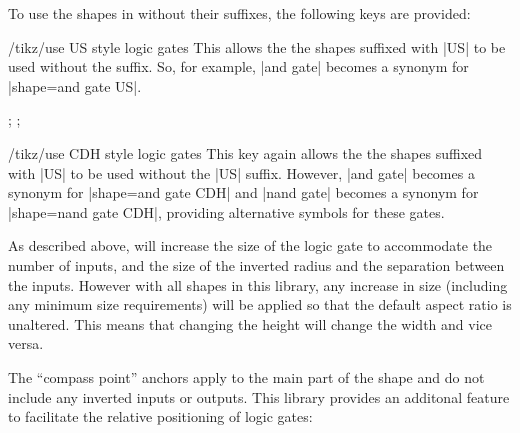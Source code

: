   To use the shapes in \tikzname{} without their suffixes, the 
  following keys are provided:
  
\begin{key}{/tikz/use US style logic gates}
	This allows the the shapes suffixed with |US| to be used without
	the suffix. So, for example, |and gate| becomes a synonym for
	|shape=and gate US|.
\begin{codeexample}[]
\tikz{};
\space
{};
\end{codeexample}
\end{key}

\begin{key}{/tikz/use CDH style logic gates}
	This key again allows the the shapes suffixed with |US| to be used 
	without	the |US| suffix. However, |and gate| becomes a synonym for
	|shape=and gate CDH| and |nand gate| becomes a synonym for
	|shape=nand gate CDH|, providing alternative symbols for these
	gates.
	
\begin{codeexample}[]
\end{codeexample}
\end{key}



As described above, \pgfname{} will increase the size of the 
logic gate to accommodate the number of inputs, and the size
of the inverted radius and the separation between the inputs.
However with all shapes in this library, any increase in size 
(including any minimum size requirements) will be applied so that 
the default aspect ratio is unaltered. This means that changing
the height will change the width and vice versa. 

The ``compass point'' anchors apply to the main part of the shape
and do not include any inverted inputs or outputs. This library
provides an additonal feature to facilitate the relative positioning
of logic gates:

